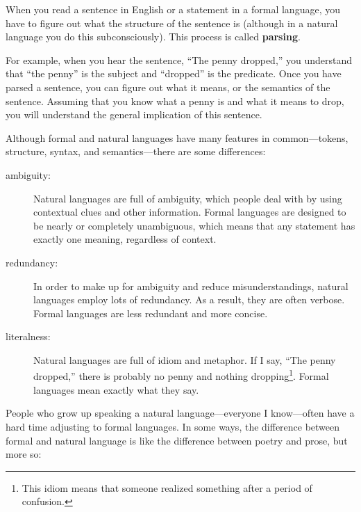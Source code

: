 \documentclass[10pt]{book}
\begin{document}
When you read a sentence in English or a statement in a formal language, you have to figure out what the 
structure of the sentence is (although in a natural language you do this subconsciously).  This process 
is called {\bf parsing}.


For example, when you hear the sentence, ``The penny dropped,'' you understand that ``the penny'' is the 
subject and ``dropped'' is the predicate.  Once you have parsed a sentence, you can figure out what it 
means, or the semantics of the sentence.  Assuming that you know what a penny is and what it means to 
drop, you will understand the general implication of this sentence.

Although formal and natural languages have many features in common---tokens, structure, syntax, and 
semantics---there are some differences:


\begin{description}

\item[ambiguity:] Natural languages are full of ambiguity, which people deal with by using contextual 
clues and other information. Formal languages are designed to be nearly or completely unambiguous, which 
means that any statement has exactly one meaning, regardless of context.

\item[redundancy:] In order to make up for ambiguity and reduce misunderstandings, natural languages employ 
lots of redundancy.  As a result, they are often verbose.  Formal languages are less redundant and more 
concise.

\item[literalness:] Natural languages are full of idiom and metaphor. If I say, ``The penny dropped,'' 
there is probably no penny and nothing dropping\footnote{This idiom means that someone realized something 
after a period of confusion.}.  Formal languages mean exactly what they say.

\end{description}

People who grow up speaking a natural language---everyone I know---often have a hard time adjusting to 
formal languages.  In some ways, the difference between formal and natural language is like the 
difference between poetry and prose, but more so:

\end{document}
